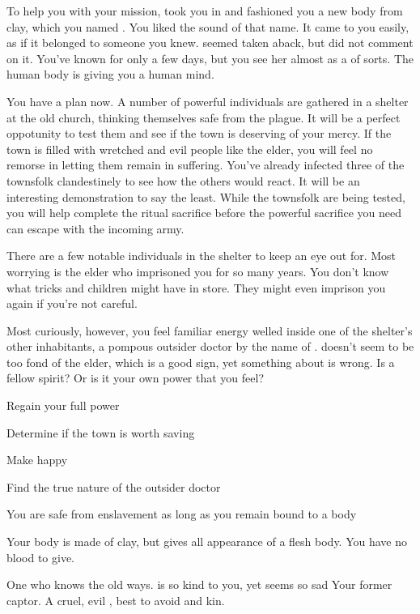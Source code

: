 \documentclass[char]{guildcamp4}
\begin{document}
To help you with your mission, \cShaman{} took you in and fashioned you a new body from clay, which you named \cPlaguebearer{}. You liked the sound of that name. It came to you easily, as if it belonged to someone you knew.  \cShaman{} seemed taken aback, but \cShaman{\they} did not comment on it. You've known \cShaman{\them} for only a few days, but you see her almost as a \cShaman{\parent} of sorts. The human body is giving you a human mind.

You have a plan now. A number of powerful individuals are gathered in a shelter at the old church, thinking themselves safe from the plague. It will be a perfect oppotunity to test them and see if the town is deserving of your mercy. If the town is filled with wretched and evil people like the elder, you will feel no remorse in letting them remain in suffering. You've already infected three of the townsfolk clandestinely to see how the others would react. It will be an interesting demonstration to say the least. While the townsfolk are being tested, you will help \cShaman{} complete the ritual sacrifice before the powerful sacrifice you need can escape with the incoming army.

There are a few notable individuals in the shelter to keep an eye out for. Most worrying is the elder who imprisoned you for so many years. You don't know what tricks \cElder{\they} and \cElder{\their} children might have in store. They might even imprison you again if you're not careful. 

Most curiously, however, you feel familiar energy welled inside one of the shelter's other inhabitants, a pompous outsider doctor by the name of \cOutsider{}. \cOutsider{\They} doesn't seem to be too fond of the elder, which is a good sign, yet something about \cOutsider{\them} is wrong. Is \cOutsider{\they} a fellow spirit? Or is it your own power that you feel?

\begin{itemz}[Goals]
	\item Regain your full power
	\item Determine if the town is worth saving
	\item Make \cShaman{} happy
	\item Find the true nature of the outsider doctor
\end{itemz}

\begin{itemz}[Notes]
	\item You are safe from enslavement as long as you remain bound to a body
	\item Your body is made of clay, but gives all appearance of a flesh body. You have no blood to give.
\end{itemz}

\begin{contacts}
	\contact{\cShaman{}} One who knows the old ways. \cShaman{\They} is so kind to you, yet \cShaman{\they} seems so sad
	\contact{\cElder{}} Your former captor. A cruel, evil \cElder{\human}, best to avoid \cElder{\them} and \cElder{\their} kin.
\end{contacts}
\end{document}
